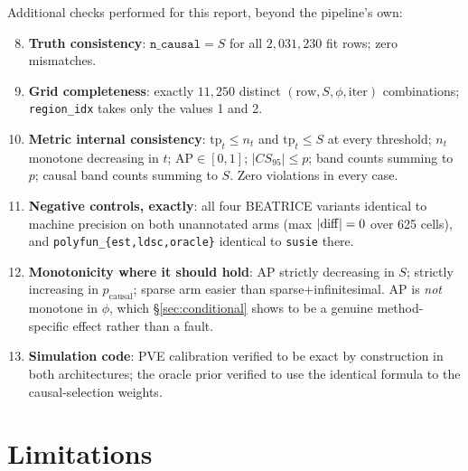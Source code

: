 \documentclass[11pt,a4paper]{article}
\begin{document}
Additional checks performed for this report, beyond the pipeline's own:

\begin{enumerate}\setcounter{enumi}{7}
\item \textbf{Truth consistency}: $\texttt{n\_causal}=S$ for all $2{,}031{,}230$
fit rows; zero mismatches.
\item \textbf{Grid completeness}: exactly $11{,}250$ distinct
$(\text{row},S,\phi,\text{iter})$ combinations; \texttt{region\_idx} takes only
the values 1 and 2.
\item \textbf{Metric internal consistency}: $\mathrm{tp}_t\le n_t$ and
$\mathrm{tp}_t\le S$ at every threshold; $n_t$ monotone decreasing in $t$;
$\mathrm{AP}\in[0,1]$; $|CS_{95}|\le p$; band counts summing to $p$; causal band
counts summing to $S$. Zero violations in every case.
\item \textbf{Negative controls, exactly}: all four BEATRICE variants identical
to machine precision on both unannotated arms (max $|{\rm diff}|=0$ over 625
cells), and \texttt{polyfun\_\{est,ldsc,oracle\}} identical to \texttt{susie}
there.
\item \textbf{Monotonicity where it should hold}: AP strictly decreasing in $S$;
strictly increasing in $p_{\text{causal}}$; sparse arm easier than
sparse+infinitesimal. AP is \emph{not} monotone in $\phi$, which
\S\ref{sec:conditional} shows to be a genuine method-specific effect rather than
a fault.
\item \textbf{Simulation code}: PVE calibration verified to be exact by
construction in both architectures; the oracle prior verified to use the
identical formula to the causal-selection weights.
\end{enumerate}

\section{Limitations}\label{sec:limits}
\end{document}

